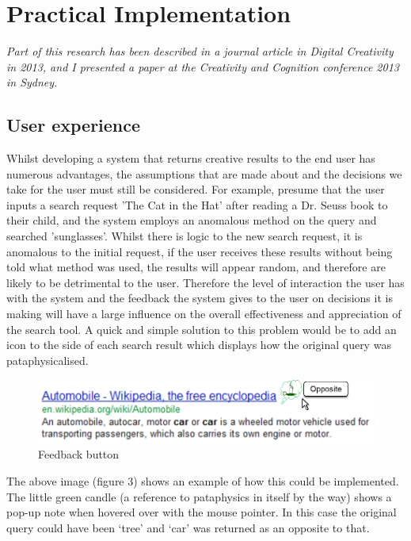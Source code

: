 
\chapter{Practical Implementation}
\label{ch:practical}

\emph{Part of this research has been described in a journal article in Digital Creativity in 2013, and I presented a paper at the Creativity and Cognition conference 2013 in Sydney.}

\grule

\section{User experience}

Whilst developing a system that returns creative results to the end user has numerous advantages, the assumptions that are made about and the decisions we take for the user must still be considered. For example, presume that the user inputs a search request 'The Cat in the Hat' after reading a Dr. Seuss book to their child, and the system employs an anomalous method on the query and searched 'sunglasses'. Whilst there is logic to the new search request, it is anomalous to the initial request, if the user receives these results without being told what method was used, the results will appear random, and therefore are likely to be detrimental to the user. Therefore the level of interaction the user has with the system and the feedback the system gives to the user on decisions it is making will have a large influence on the overall effectiveness and appreciation of the search tool. A quick and simple solution to this problem would be to add an icon to the side of each search result which displays how the original query was pataphysicalised.

\begin{figure}[htb] %
  \centering
  \includegraphics[width=\linewidth]{images/resultexample}
\caption[Feedback button]{Feedback button}
\label{fig:feedback}
\end{figure}

The above image (figure 3) shows an example of how this could be implemented. The little green candle (a reference to pataphysics in itself by the way) shows a pop-up note when hovered over with the mouse pointer. In this case the original query could have been ‘tree’ and ‘car’ was returned as an opposite to that.

